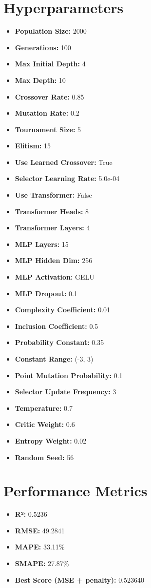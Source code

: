 \documentclass{article}
\begin{document}
\section*{Hyperparameters}
\begin{itemize}
\item \textbf{Population Size:} 2000
\item \textbf{Generations:} 100
\item \textbf{Max Initial Depth:} 4
\item \textbf{Max Depth:} 10
\item \textbf{Crossover Rate:} 0.85
\item \textbf{Mutation Rate:} 0.2
\item \textbf{Tournament Size:} 5
\item \textbf{Elitism:} 15
\item \textbf{Use Learned Crossover:} True
\item \textbf{Selector Learning Rate:} 5.0e-04
\item \textbf{Use Transformer:} False
\item \textbf{Transformer Heads:} 8
\item \textbf{Transformer Layers:} 4
\item \textbf{MLP Layers:} 15
\item \textbf{MLP Hidden Dim:} 256
\item \textbf{MLP Activation:} GELU
\item \textbf{MLP Dropout:} 0.1
\item \textbf{Complexity Coefficient:} 0.01
\item \textbf{Inclusion Coefficient:} 0.5
\item \textbf{Probability Constant:} 0.35
\item \textbf{Constant Range:} (-3, 3)
\item \textbf{Point Mutation Probability:} 0.1
\item \textbf{Selector Update Frequency:} 3
\item \textbf{Temperature:} 0.7
\item \textbf{Critic Weight:} 0.6
\item \textbf{Entropy Weight:} 0.02
\item \textbf{Random Seed:} 56
\end{itemize}
\section*{Performance Metrics}
\begin{itemize}
\item \textbf{R²:} 0.5236
\item \textbf{RMSE:} 49.2841
\item \textbf{MAPE:} 33.11\%
\item \textbf{SMAPE:} 27.87\%
\item \textbf{Best Score (MSE + penalty):} 0.523640
\end{itemize}
\end{document}
